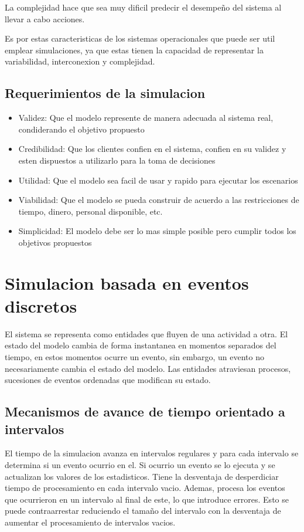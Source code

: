 \documentclass[a4paper]{article}
\begin{document}
La complejidad hace que sea muy dificil predecir el desempeño del sistema
al llevar a cabo acciones.

Es por estas caracteristicas de los sistemas operacionales que puede ser
util emplear simulaciones, ya que estas tienen la capacidad de representar
la variabilidad, interconexion y complejidad.

\subsection*{Requerimientos de la simulacion}
\begin{itemize}
    \item Validez: Que el modelo represente de manera adecuada al sistema real,
    condiderando el objetivo propuesto
    \item Credibilidad: Que los clientes confien en el sistema, confien en su 
    validez y esten dispuestos a utilizarlo para la toma de decisiones
    \item Utilidad: Que el modelo sea facil de usar y rapido para ejecutar los 
    escenarios
    \item Viabilidad: Que el modelo se pueda construir de acuerdo a las restricciones
    de tiempo, dinero, personal disponible, etc.
    \item Simplicidad: El modelo debe ser lo mas simple posible pero cumplir todos los 
    objetivos propuestos
\end{itemize}

\section*{Simulacion basada en eventos discretos}
El sistema se representa como entidades que fluyen de una actividad a otra.
El estado del modelo cambia de forma instantanea en momentos separados del 
tiempo, en estos momentos ocurre un evento, sin embargo, un evento no 
necesariamente cambia el estado del modelo.
Las entidades atraviesan procesos, sucesiones de eventos ordenadas que modifican
su estado.

\subsection*{Mecanismos de avance de tiempo orientado a intervalos}
El tiempo de la simulacion avanza en intervalos regulares y para cada intervalo 
se determina si un evento ocurrio en el. Si ocurrio un evento se lo ejecuta y 
se actualizan los valores de los estadisticos.
Tiene la desventaja de desperdiciar tiempo de procesamiento en cada intervalo 
vacio. Ademas, procesa los eventos que ocurrieron en un intervalo al final de este, 
lo que introduce errores. Esto se puede contraarrestar reduciendo el tamaño del 
intervalo con la desventaja de aumentar el procesamiento de intervalos vacios.
\end{document}
